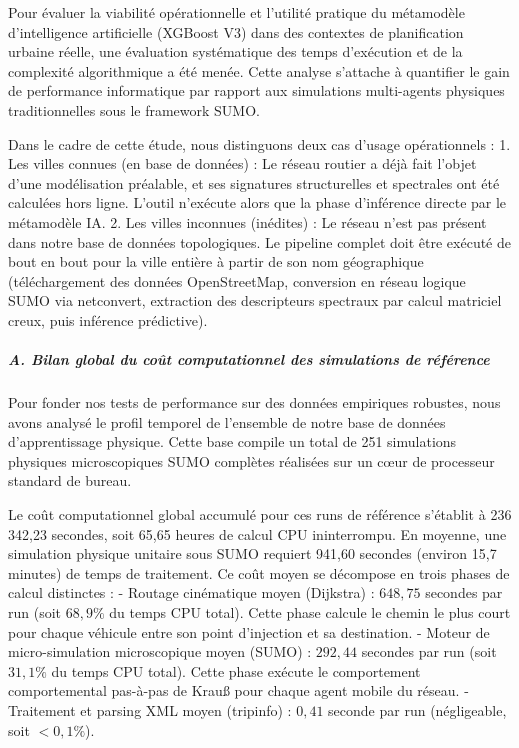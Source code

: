 \documentclass[10pt, a4paper]{article}
\begin{document}
Pour évaluer la viabilité opérationnelle et l'utilité pratique du
métamodèle d'intelligence artificielle (XGBoost V3) dans des contextes
de planification urbaine réelle, une évaluation systématique des temps
d'exécution et de la complexité algorithmique a été menée. Cette analyse
s'attache à quantifier le gain de performance informatique par rapport
aux simulations multi-agents physiques traditionnelles sous le framework
SUMO.

Dans le cadre de cette étude, nous distinguons deux cas d'usage
opérationnels : 1. Les villes connues (en base de données) : Le réseau
routier a déjà fait l'objet d'une modélisation préalable, et ses
signatures structurelles et spectrales ont été calculées hors ligne.
L'outil n'exécute alors que la phase d'inférence directe par le
métamodèle IA. 2. Les villes inconnues (inédites) : Le réseau n'est pas
présent dans notre base de données topologiques. Le pipeline complet
doit être exécuté de bout en bout pour la ville entière à partir de son
nom géographique (téléchargement des données OpenStreetMap, conversion
en réseau logique SUMO via netconvert, extraction des descripteurs
spectraux par calcul matriciel creux, puis inférence prédictive).

\subparagraph{A. Bilan global du coût computationnel des simulations de
référence}\label{a.-bilan-global-du-couxfbt-computationnel-des-simulations-de-ruxe9fuxe9rence}

Pour fonder nos tests de performance sur des données empiriques
robustes, nous avons analysé le profil temporel de l'ensemble de notre
base de données d'apprentissage physique. Cette base compile un total de
251 simulations physiques microscopiques SUMO complètes réalisées sur un
cœur de processeur standard de bureau.

Le coût computationnel global accumulé pour ces runs de référence
s'établit à 236 342,23 secondes, soit 65,65 heures de calcul CPU
ininterrompu. En moyenne, une simulation physique unitaire sous SUMO
requiert 941,60 secondes (environ 15,7 minutes) de temps de traitement.
Ce coût moyen se décompose en trois phases de calcul distinctes : -
Routage cinématique moyen (Dijkstra) : \(648,75\) secondes par run (soit
\(68,9\%\) du temps CPU total). Cette phase calcule le chemin le plus
court pour chaque véhicule entre son point d'injection et sa
destination. - Moteur de micro-simulation microscopique moyen (SUMO) :
\(292,44\) secondes par run (soit \(31,1\%\) du temps CPU total). Cette
phase exécute le comportement comportemental pas-à-pas de Krauß pour
chaque agent mobile du réseau. - Traitement et parsing XML moyen
(tripinfo) : \(0,41\) seconde par run (négligeable, soit \(<0,1\%\)).
\end{document}

